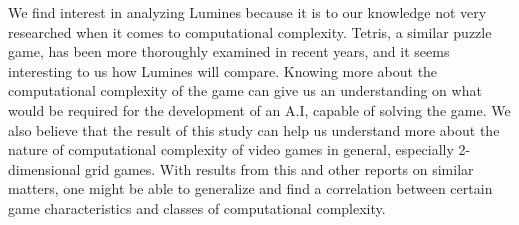 We find interest in analyzing Lumines because it is to our knowledge not very researched when it comes to computational complexity. Tetris, a similar puzzle game, has been more thoroughly examined in recent years, and it seems interesting to us how Lumines will compare. Knowing more about the computational complexity of the game can give us an understanding on what would be required for the development of an A.I, capable of solving the game. We also believe that the result of this study can help us understand more about the nature of computational complexity of video games in general, especially 2-dimensional grid games. With results from this and other reports on similar matters, one might be able to generalize and find a correlation between certain game characteristics and classes of computational complexity. 
